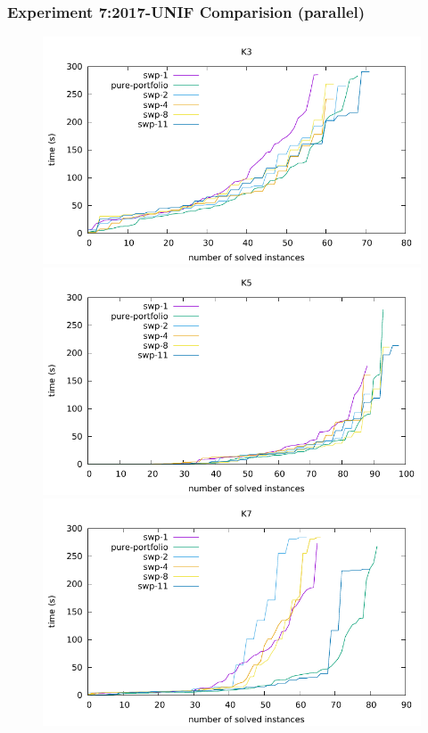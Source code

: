 \documentclass[12pt,a4paper,twoside]{scrartcl}
\numberwithin{equation}{section}
\begin{document}
\subsubsection{Experiment 7:2017-UNIF Comparision (parallel)} 
\label{sec:Experiment 7}

 \begin{figure}[H]
\begin{center}
  \includegraphics[scale = 0.8]{Parallel/K3/e2.pdf}
    \includegraphics[scale = 0.8]{Parallel/K5/e2.pdf}
  \includegraphics[scale = 0.8]{Parallel/K7/e2.pdf}
  \end{center}
  \caption{}
  \label{Experiment 6 COMBINE}
  \end{figure}
\clearpage
\end{document}
